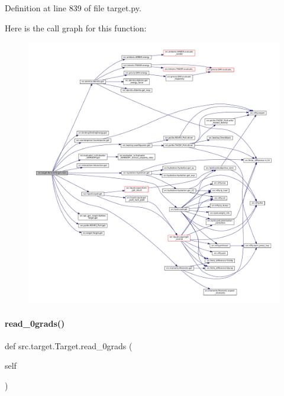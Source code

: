 Definition at line 839 of file target.\+py.

Here is the call graph for this function\+:
\nopagebreak
\begin{figure}[H]
\begin{center}
\leavevmode
\includegraphics[width=350pt]{classsrc_1_1target_1_1RemoteTarget_a33f52ff218e41fc3c3046af7d8107970_cgraph}
\end{center}
\end{figure}
\mbox{\label{classsrc_1_1target_1_1Target_a606efa8b4e93982266468373c809e36a}} 
\paragraph{\texorpdfstring{read\+\_\+0grads()}{read\_0grads()}}
{\footnotesize\ttfamily def src.\+target.\+Target.\+read\+\_\+0grads (\begin{DoxyParamCaption}\item[{}]{self }\end{DoxyParamCaption})\hspace{0.3cm}{\ttfamily [inherited]}}



